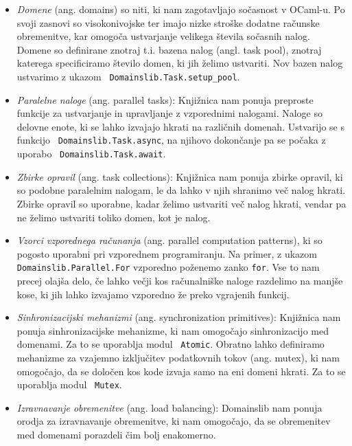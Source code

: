 \documentclass[mat1, tisk]{fmfdelo}
\begin{document}
\begin{itemize} \label{itemize:domainslib}
  \item \emph{Domene} (ang. domains) so niti, ki nam zagotavljajo sočasnost v OCaml-u. 
        Po svoji zasnovi so visokonivojske ter imajo nizke stroške dodatne računske obremenitve, kar
        omogoča ustvarjanje velikega števila sočasnih nalog. Domene so definirane znotraj t.i. bazena nalog
        (angl. task pool), znotraj katerega specificiramo število domen, ki jih želimo ustvariti. Nov bazen
        nalog ustvarimo z ukazom ~\texttt{Domainslib.Task.setup\_pool}.
  \item \emph{Paralelne naloge} (ang. parallel tasks): Knjižnica nam ponuja preproste funkcije za ustvarjanje in upravljanje
        z vzporednimi nalogami. Naloge so delovne enote, ki se lahko izvajajo hkrati na različnih domenah.
        Ustvarijo se s funkcijo ~\texttt{Domainslib.Task.async}, na njihovo dokončanje pa se počaka z uporabo
        ~\texttt{Domainslib.Task.await}.
  \item \emph{Zbirke opravil} (ang. task collections): Knjižnica nam ponuja zbirke opravil, ki so podobne paralelnim nalogam, 
        le da lahko v njih shranimo več nalog hkrati. Zbirke opravil so uporabne, kadar želimo ustvariti več nalog hkrati,
        vendar pa ne želimo ustvariti toliko domen, kot je nalog.
  \item \emph{Vzorci vzporednega računanja} (ang. parallel computation patterns), ki so pogosto uporabni pri vzporednem
        programiranju. Na primer, z ukazom \linebreak \texttt{Domainslib.Parallel.For} vzporedno poženemo zanko \texttt{for}.
        Vse to nam precej olajša delo, če lahko večji kos računalniške naloge razdelimo na manjše kose, ki jih lahko
        izvajamo vzporedno že preko vgrajenih funkcij.
  \item \emph{Sinhronizacijski mehanizmi} (ang. synchronization primitives): Knjižnica nam ponuja sinhronizacijske mehanizme,
        ki nam omogočajo sinhronizacijo med domenami. Za to se uporablja modul ~\texttt{Atomic}. Obratno lahko definiramo
        mehanizme za vzajemno izključitev podatkovnih tokov (ang. mutex), ki nam omogočajo, da se določen kos kode
        izvaja samo na eni domeni hkrati. Za to se uporablja modul ~\texttt{Mutex}.
  \item \emph{Izravnavanje obremenitve} (ang. load balancing): Domainslib nam ponuja orodja za izravnavanje obremenitve, 
        ki nam omogočajo, da se obremenitev med domenami porazdeli čim bolj enakomerno.
\end{itemize}
\end{document}
